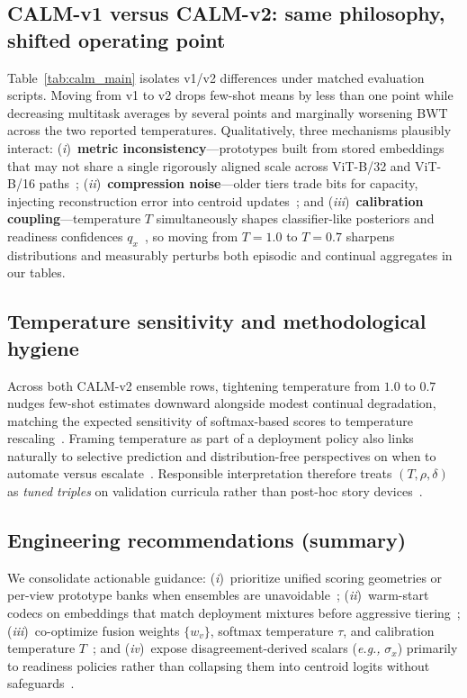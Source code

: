 \documentclass[12pt,a4paper]{report}
\begin{document}
\subsection{CALM-v1 versus CALM-v2: same philosophy, shifted operating point}
Table~\ref{tab:calm_main} isolates v1/v2 differences under matched evaluation scripts. Moving from v1 to v2 drops few-shot means by less than one point while decreasing multitask averages by several points and marginally worsening BWT across the two reported temperatures. Qualitatively, three mechanisms plausibly interact: (\emph{i})~\textbf{metric inconsistency}---prototypes built from stored embeddings that may not share a single rigorously aligned scale across ViT-B/32 and ViT-B/16 paths~\cite{r21}; (\emph{ii})~\textbf{compression noise}---older tiers trade bits for capacity, injecting reconstruction error into centroid updates~\cite{r31,r32}; and (\emph{iii})~\textbf{calibration coupling}---temperature $T$ simultaneously shapes classifier-like posteriors and readiness confidences $q_x$~\cite{r5}, so moving from $T{=}1.0$ to $T{=}0.7$ sharpens distributions and measurably perturbs both episodic and continual aggregates in our tables.

\subsection{Temperature sensitivity and methodological hygiene}
Across both CALM-v2 ensemble rows, tightening temperature from $1.0$ to $0.7$ nudges few-shot estimates downward alongside modest continual degradation, matching the expected sensitivity of softmax-based scores to temperature rescaling~\cite{r5,r26}. Framing temperature as part of a deployment policy also links naturally to selective prediction and distribution-free perspectives on when to automate versus escalate~\cite{r10}. Responsible interpretation therefore treats $(T,\rho,\delta)$ as \emph{tuned triples} on validation curricula rather than post-hoc story devices~\cite{r24}.

\subsection*{Engineering recommendations (summary)}
We consolidate actionable guidance: (\emph{i})~prioritize unified scoring geometries or per-view prototype banks when ensembles are unavoidable~\cite{r21}; (\emph{ii})~warm-start codecs on embeddings that match deployment mixtures before aggressive tiering~\cite{r31,r32}; (\emph{iii})~co-optimize fusion weights $\{w_v\}$, softmax temperature $\tau$, and calibration temperature $T$~\cite{r5,r26}; and (\emph{iv})~expose disagreement-derived scalars (\emph{e.g.,} $\sigma_x$) primarily to readiness policies rather than collapsing them into centroid logits without safeguards~\cite{r10,r21,r24}.
\end{document}
